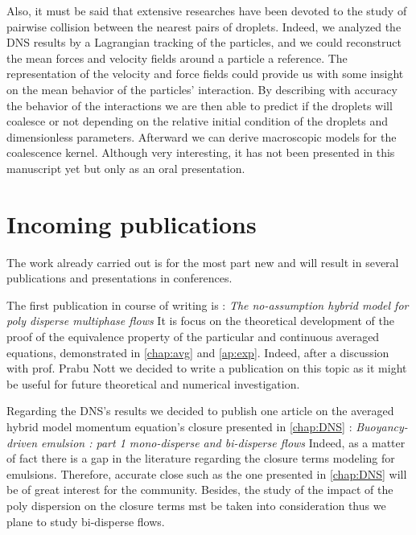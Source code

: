 Also, it must be said that extensive researches have been devoted to the study of pairwise collision between the nearest pairs of droplets.
Indeed, we analyzed the DNS results by a Lagrangian tracking of the particles, and we could reconstruct the mean forces and velocity fields around a particle a reference. 
The representation of the velocity and force fields could provide us with some insight on the mean behavior of the particles' interaction. 
By describing with accuracy the behavior of the interactions we are then able to predict if the droplets will coalesce or not depending on the relative initial condition of the droplets and dimensionless parameters. 
Afterward we can derive macroscopic models for the coalescence kernel. 
Although very interesting, it has not been presented in this manuscript yet but only as an oral presentation. 

\section*{Incoming publications}

The work already carried out  is for the most part new and will result in several publications and presentations in conferences. 

The first publication in course of writing is : \textit{The no-assumption hybrid model for poly disperse multiphase flows}
It is focus on the theoretical development of the proof of the equivalence property of the particular and continuous averaged equations, demonstrated in \ref{chap:avg} and \ref{ap:exp}. 
Indeed, after a discussion with prof. Prabu Nott we decided to write a publication on this topic as it might be useful for future theoretical and numerical investigation. 

Regarding the DNS's results we decided to publish one article on the averaged hybrid model momentum  equation's closure presented in \ref{chap:DNS} : \textit{Buoyancy-driven emulsion : part 1 mono-disperse and bi-disperse flows}
Indeed, as a matter of fact there is a gap in the literature regarding the closure terms modeling for emulsions. 
Therefore, accurate close such as the one presented in \ref{chap:DNS} will be of great interest for the community. 
Besides, the study of the impact of the poly dispersion on the closure terms mst be taken into consideration thus we plane to study bi-disperse flows.

